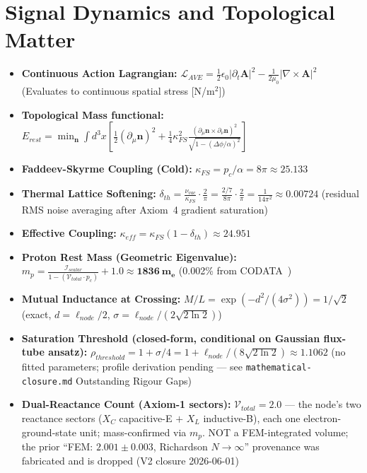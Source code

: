 \section{Signal Dynamics and Topological Matter}
\begin{itemize}
    \item \textbf{Continuous Action Lagrangian:} $\mathcal{L}_{AVE} = \frac{1}{2}\epsilon_0 |\partial_t \mathbf{A}|^2 - \frac{1}{2\mu_0} |\nabla \times \mathbf{A}|^2$ (Evaluates to continuous spatial stress [N/m$^2$])
    \item \textbf{Topological Mass functional:} $E_{rest} = \min_{\mathbf{n}} \int d^3x \left[ \frac{1}{2} (\partial_\mu \mathbf{n})^2 + \frac{1}{4} \kappa_{FS}^2 \frac{(\partial_\mu \mathbf{n} \times \partial_\nu \mathbf{n})^2}{\sqrt{1 - (\Delta\phi / \alpha)^2}} \right]$
    \item \textbf{Faddeev-Skyrme Coupling (Cold):} $\kappa_{FS} = p_c / \alpha = 8\pi \approx 25.133$
    \item \textbf{Thermal Lattice Softening:} $\delta_{th} = \frac{\nu_{vac}}{\kappa_{FS}} \cdot \frac{2}{\pi} = \frac{2/7}{8\pi} \cdot \frac{2}{\pi} = \frac{1}{14\pi^2} \approx 0.00724$ (residual RMS noise averaging after Axiom~4 gradient saturation)
    \item \textbf{Effective Coupling:} $\kappa_{eff} = \kappa_{FS}(1-\delta_{th}) \approx 24.951$
    \item \textbf{Proton Rest Mass (Geometric Eigenvalue):} $m_p = \frac{\mathcal{I}_{scalar}}{1 - (\mathcal{V}_{total} \cdot p_c)} + 1.0 \approx \mathbf{1836\ m_e}$ (0.002\% from CODATA~\cite{codata2018})
    \item \textbf{Mutual Inductance at Crossing:} $M/L = \exp(-d^2/(4\sigma^2)) = 1/\sqrt{2}$ (exact, $d = \ell_{node}/2$, $\sigma = \ell_{node}/(2\sqrt{2\ln2})$)
    \item \textbf{Saturation Threshold (closed-form, conditional on Gaussian flux-tube ansatz):} $\rho_{threshold} = 1 + \sigma/4 = 1 + \ell_{node}/(8\sqrt{2\ln 2}) \approx 1.1062$ (no fitted parameters; profile derivation pending — see \texttt{mathematical-closure.md} Outstanding Rigour Gaps)
    \item \textbf{Dual-Reactance Count (Axiom-1 sectors):} $\mathcal{V}_{total} = 2.0$ --- the node's two reactance sectors ($X_C$ capacitive-E $+$ $X_L$ inductive-B), each one electron-ground-state unit; mass-confirmed via $m_p$. NOT a FEM-integrated volume; the prior ``FEM: $2.001 \pm 0.003$, Richardson $N\to\infty$'' provenance was fabricated and is dropped (V2 closure 2026-06-01)

\end{itemize}
